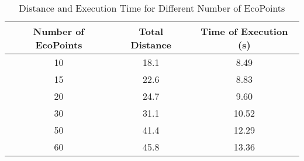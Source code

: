 







\begin{table}[H]
\begin{center}
    \begin{tabular}{|c|c|c|}
        \hline
        \textbf{Number of EcoPoints} & \textbf{Total Distance} & \textbf{Time of Execution} (s) \\ \hline
        10 & 18.1 & 8.49 \\ \hline
        15 & 22.6 & 8.83 \\ \hline
        20 & 24.7 & 9.60 \\ \hline
        30 & 31.1 & 10.52 \\ \hline
        50 & 41.4 & 12.29 \\ \hline
        60 & 45.8 & 13.36 \\ \hline
    \end{tabular}
    \caption{Distance and Execution Time for Different Number of EcoPoints}
    \label{tab:NepDisExectime}
\end{center}
\end{table}

